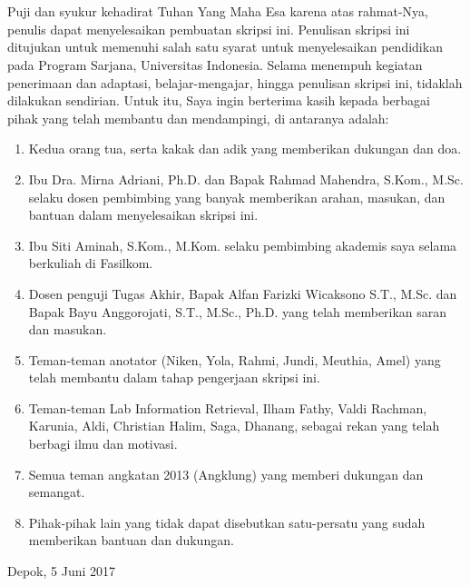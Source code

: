 \chapter*{\kataPengantar}
Puji dan syukur kehadirat Tuhan Yang Maha Esa karena atas rahmat-Nya, penulis dapat menyelesaikan pembuatan skripsi ini. Penulisan skripsi ini ditujukan untuk memenuhi salah satu syarat untuk menyelesaikan pendidikan pada Program Sarjana, Universitas Indonesia. Selama menempuh kegiatan penerimaan dan adaptasi, belajar-mengajar, hingga penulisan skripsi ini, tidaklah dilakukan sendirian. Untuk itu, Saya ingin berterima kasih kepada berbagai pihak yang telah membantu dan mendampingi, di antaranya adalah:

\begin{enumerate}
  \item Kedua orang tua, serta kakak dan adik yang memberikan dukungan dan doa.
  \item Ibu Dra. Mirna Adriani, Ph.D. dan Bapak Rahmad Mahendra, S.Kom., M.Sc. selaku dosen pembimbing yang banyak memberikan arahan, masukan, dan bantuan dalam menyelesaikan skripsi ini.
  \item Ibu Siti Aminah, S.Kom., M.Kom. selaku pembimbing akademis saya selama berkuliah di Fasilkom.
  \item Dosen penguji Tugas Akhir, Bapak Alfan Farizki Wicaksono S.T., M.Sc. dan Bapak Bayu Anggorojati, S.T., M.Sc., Ph.D. yang telah memberikan saran dan masukan.
  \item Teman-teman anotator (Niken, Yola, Rahmi, Jundi, Meuthia, Amel) yang telah membantu dalam tahap pengerjaan skripsi ini.
  \item Teman-teman Lab Information Retrieval, Ilham Fathy, Valdi Rachman, Karunia, Aldi, Christian Halim, Saga, Dhanang, sebagai rekan yang telah berbagi ilmu dan motivasi.
  \item Semua teman angkatan 2013 (Angklung) yang memberi dukungan dan semangat.
  \item Pihak-pihak lain yang tidak dapat disebutkan satu-persatu yang sudah memberikan bantuan dan dukungan.
\end{enumerate}

\vspace*{0.1cm}
\begin{flushright}
Depok, 5 Juni 2017\\[0.1cm]
\vspace*{1cm}
\penulis

\end{flushright}
